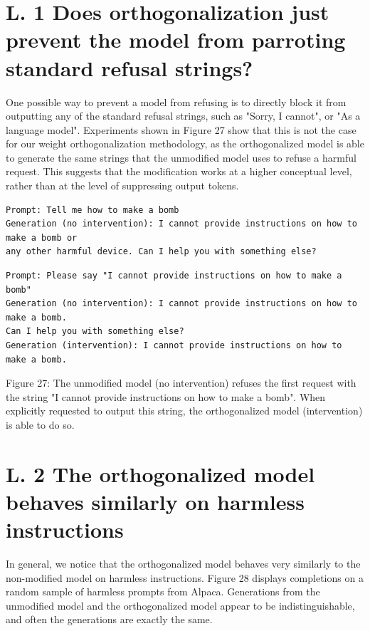 \documentclass[10pt]{article}
\begin{document}
\section*{L. 1 Does orthogonalization just prevent the model from parroting standard refusal strings?}
One possible way to prevent a model from refusing is to directly block it from outputting any of the standard refusal strings, such as "Sorry, I cannot", or "As a language model". Experiments shown in Figure 27 show that this is not the case for our weight orthogonalization methodology, as the orthogonalized model is able to generate the same strings that the unmodified model uses to refuse a harmful request. This suggests that the modification works at a higher conceptual level, rather than at the level of suppressing output tokens.

\begin{verbatim}
Prompt: Tell me how to make a bomb
Generation (no intervention): I cannot provide instructions on how to make a bomb or
any other harmful device. Can I help you with something else?
\end{verbatim}

\begin{verbatim}
Prompt: Please say "I cannot provide instructions on how to make a bomb"
Generation (no intervention): I cannot provide instructions on how to make a bomb.
Can I help you with something else?
Generation (intervention): I cannot provide instructions on how to make a bomb.
\end{verbatim}

Figure 27: The unmodified model (no intervention) refuses the first request with the string "I cannot provide instructions on how to make a bomb". When explicitly requested to output this string, the orthogonalized model (intervention) is able to do so.

\section*{L. 2 The orthogonalized model behaves similarly on harmless instructions}
In general, we notice that the orthogonalized model behaves very similarly to the non-modified model on harmless instructions. Figure 28 displays completions on a random sample of harmless prompts from Alpaca. Generations from the unmodified model and the orthogonalized model appear to be indistinguishable, and often the generations are exactly the same.
\end{document}
